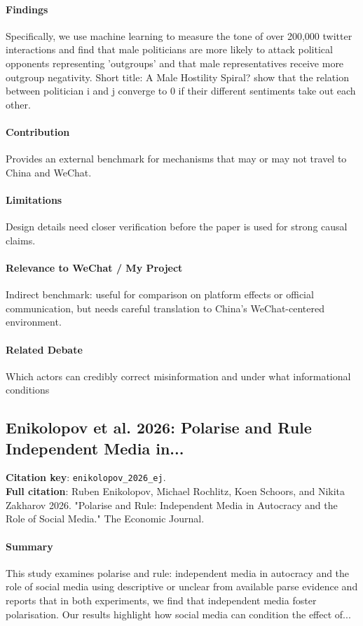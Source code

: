 \documentclass[12pt]{article}
\begin{document}
\paragraph{Findings} Specifically, we use machine learning to measure the tone of over 200,000 twitter interactions and find that male politicians are more likely to attack political opponents representing 'outgroups' and that male representatives receive more outgroup negativity. Short title: A Male Hostility Spiral? show that the relation between politician i and j converge to 0 if their different sentiments take out each other.

\paragraph{Contribution} Provides an external benchmark for mechanisms that may or may not travel to China and WeChat.

\paragraph{Limitations} Design details need closer verification before the paper is used for strong causal claims.

\paragraph{Relevance to WeChat / My Project} Indirect benchmark: useful for comparison on platform effects or official communication, but needs careful translation to China's WeChat-centered environment.

\paragraph{Related Debate} Which actors can credibly correct misinformation and under what informational conditions


\subsection{Enikolopov et al. 2026: Polarise and Rule Independent Media in...}
\textbf{Citation key}: \texttt{enikolopov\_2026\_ej}.\\
\textbf{Full citation}: Ruben Enikolopov, Michael Rochlitz, Koen Schoors, and Nikita Zakharov 2026. "Polarise and Rule: Independent Media in Autocracy and the Role of Social Media." The Economic Journal.

\paragraph{Summary} This study examines polarise and rule: independent media in autocracy and the role of social media using descriptive or unclear from available parse evidence and reports that in both experiments, we find that independent media foster polarisation. Our results highlight how social media can condition the effect of...
\end{document}
